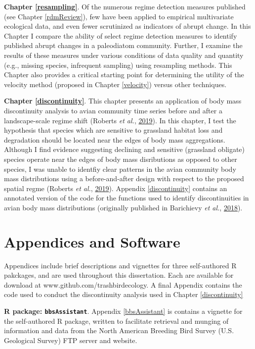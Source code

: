 \documentclass[print]{nuthesis}
\begin{document}
\textbf{Chapter \ref{resampling}}. Of the numerous regime detection measures published (see Chapter \ref{rdmReview}), few have been applied to empirical multivariate ecological data, and even fewer scrutinized as indicators of abrupt change. In this Chapter I compare the ability of select regime detection measures to identify published abrupt changes in a paleodiatom community. Further, I examine the results of these measures under various conditions of data quality and quantity (e.g., missing species, infrequent sampling) using resampling methods. This Chapter also provides a critical starting point for determining the utility of the velocity method (proposed in Chapter \ref{velocity}) versus other techniques.

\textbf{Chapter \ref{discontinuity}}. This chapter presents an application of body mass discontinuity analysis to avian community time series before and after a landscape-scale regime shift (Roberts \emph{et al.}, \protect\hyperlink{ref-roberts2019shifting}{2019}). In this chapter, I test the hypothesis that species which are sensitive to grassland habitat loss and degradation should be located near the edges of body mass aggregations. Although I find evidence suggesting declining and sensitive (grassland obligate) species operate near the edges of body mass disributions as opposed to other species, I was unable to identfiy clear patterns in the avian community body mass distributions using a before-and-after design with respect to the proposed spatial regme (Roberts \emph{et al.}, \protect\hyperlink{ref-roberts2019shifting}{2019}). Appendix \ref{discontinuity} contains an annotated version of the code for the functions used to identify discontinuities in avian body mass distributions (originally published in Barichievy \emph{et al.}, \protect\hyperlink{ref-barichievy2018method}{2018}).

\hypertarget{appendices-and-software}{%
\section{Appendices and Software}\label{appendices-and-software}}

Appendices include brief descriptions and vignettes for three self-authored R pakckages, and are used throughout this dissertation. Each are available for download at www.github.com/trashbirdecology. A final Appendix contains the code used to conduct the discontinuity analysis used in Chapter \ref{discontinuity}

\textbf{R package: \texttt{bbsAssistant}}. Appendix \ref{bbsAssistant} is contains a vignette for the self-authored R package, written to facilitate retrieval and munging of information and data from the North American Breeding Bird Survey (U.S. Geological Survey) FTP server and website.
\end{document}
